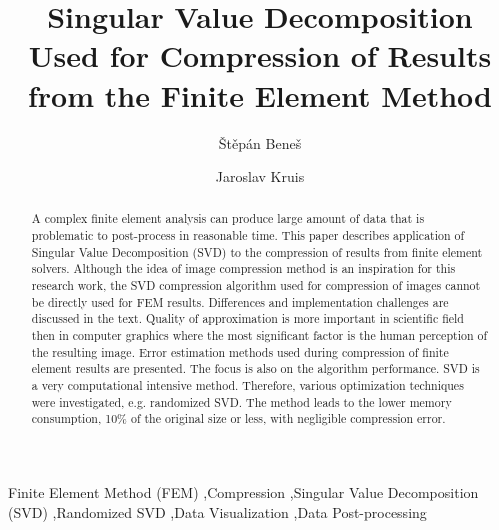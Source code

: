 \documentclass[preprint,12pt]{elsarticle}
\begin{document}
\begin{frontmatter}


\title{Singular Value Decomposition Used for Compression of Results from the Finite Element Method}

\author{\v{S}t\v{e}p\'{a}n Bene\v{s}} %
\author{Jaroslav Kruis}

\address{Department of Mechanics, Faculty of Civil Engineering, Czech Technical University in Prague Th\'akurova 7, Prague 166 29, Czech Republic}

\begin{abstract}
A complex finite element analysis can produce large amount of data that is problematic to post-process in reasonable time. This paper describes application of Singular Value Decomposition (SVD) to the compression of results from finite element solvers. Although the idea of image compression method is an inspiration for this research work, the SVD compression algorithm used for compression of images cannot be directly used for FEM results. Differences and implementation challenges are discussed in the text. Quality of approximation is more important in scientific field then in computer graphics where the most significant factor is the human perception of the resulting image. Error estimation methods used during compression of finite element results are presented. The focus is also on the algorithm performance. SVD is a very computational intensive method. Therefore, various optimization techniques were investigated, e.g. randomized SVD. The method leads to the lower memory consumption, 10\% of the original size or less, with negligible compression error.
\end{abstract}

\begin{keyword}
Finite Element Method (FEM) \sep Compression \sep Singular Value Decomposition (SVD) \sep Randomized SVD \sep Data Visualization \sep Data Post-processing
\end{keyword}

\end{frontmatter}

\end{document}
